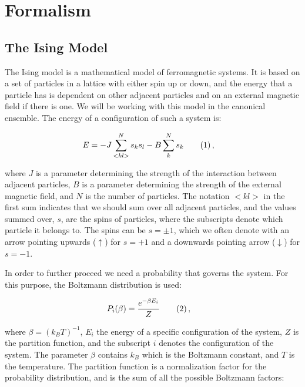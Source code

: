 \documentclass[reprint,english,notitlepage]{revtex4-1}  %
\newcommand\numberthis{\addtocounter{equation}{1}\tag{\theequation}}
\begin{document}
\newpage

\section{Formalism} \label{sec:II}

\subsection{The Ising Model} \label{sec:II:a}

The Ising model is a mathematical model of ferromagnetic systems. It is based on a set of particles in a lattice with either spin up or down, and the energy that a particle has is dependent on other adjacent particles and on an external magnetic field if there is one. We will be working with this model in the canonical ensemble. The energy of a configuration of such a system is:

\begin{align*}
E &= -J \sum\limits_{<kl>}^N s_k s_l - B \sum\limits_k^N s_k \numberthis \label{eq:ising_general_total_energy} \, ,
\end{align*}

where $J$ is a parameter determining the strength of the interaction between adjacent particles, $B$ is a parameter determining the strength of the external magnetic field, and $N$ is the number of particles. The notation $<kl>$ in the first sum indicates that we should sum over all adjacent particles, and the values summed over, $s$, are the spins of particles, where the subscripts denote which particle it belongs to. The spins can be $s = \pm 1$, which we often denote with an arrow pointing upwards ($\uparrow$) for $s = +1$ and a downwards pointing arrow ($\downarrow$) for $s = -1$.

In order to further proceed we need a probability that governs the system. For this purpose, the Boltzmann distribution is used:

\begin{align*}
P_i (\beta) &= \frac{e^{-\beta E_i}}{Z} \numberthis \label{eq:boltzmann_dist} \, ,
\end{align*}

where $\beta = (k_B T)^{-1}$, $E_i$ the energy of a specific configuration of the system, $Z$ is the partition function, and the subscript $i$ denotes the configuration of the system. The parameter $\beta$ contains $k_B$ which is the Boltzmann constant, and $T$ is the temperature. The partition function is a normalization factor for the probability distribution, and is the sum of all the possible Boltzmann factors:
\end{document}
